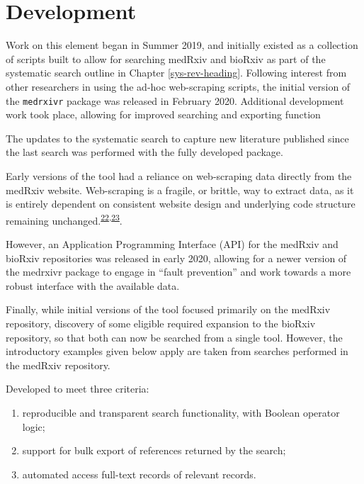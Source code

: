 \documentclass[a4paper, twoside]{templates/ociamthesis}
\providecommand{\tightlist}{%
  \setlength{\itemsep}{0pt}\setlength{\parskip}{0pt}}
\begin{document}
\hypertarget{development}{%
\section{Development}\label{development}}

Work on this element began in Summer 2019, and initially existed as a collection of scripts built to allow for searching medRxiv and bioRxiv as part of the systematic search outline in Chapter \ref{sys-rev-heading}. Following interest from other researchers in using the ad-hoc web-scraping scripts, the initial version of the \texttt{medrxivr} package was released in February 2020. Additional development work took place, allowing for improved searching and exporting function

The updates to the systematic search to capture new literature published since the last search was performed with the fully developed package.

Early versions of the tool had a reliance on web-scraping data directly from the medRxiv website. Web-scraping is a fragile, or brittle, way to extract data, as it is entirely dependent on consistent website design and underlying code structure remaining unchanged.\textsuperscript{\protect\hyperlink{ref-shaw2002}{22},\protect\hyperlink{ref-laprie1992}{23}}.

However, an Application Programming Interface (API) for the medRxiv and bioRxiv repositories was released in early 2020, allowing for a newer version of the medrxivr package to engage in ``fault prevention'' and work towards a more robust interface with the available data.

Finally, while initial versions of the tool focused primarily on the medRxiv repository, discovery of some eligible required expansion to the bioRxiv repository, so that both can now be searched from a single tool. However, the introductory examples given below apply are taken from searches performed in the medRxiv repository.

Developed to meet three criteria:

\begin{enumerate}
\def\labelenumi{\arabic{enumi}.}
\tightlist
\item
  reproducible and transparent search functionality, with Boolean operator logic;\\
\item
  support for bulk export of references returned by the search;\\
\item
  automated access full-text records of relevant records.
\end{enumerate}
\end{document}
